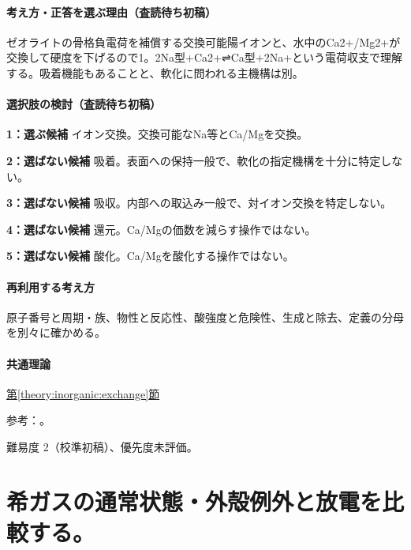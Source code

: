 \paragraph{考え方・正答を選ぶ理由（査読待ち初稿）} ゼオライトの骨格負電荷を補償する交換可能陽イオンと、水中のCa2+/Mg2+が交換して硬度を下げるので1。2Na型+Ca2+⇌Ca型+2Na+という電荷収支で理解する。吸着機能もあることと、軟化に問われる主機構は別。

\paragraph{選択肢の検討（査読待ち初稿）}\mbox{}\par

\noindent\textbf{1：選ぶ候補} イオン交換。交換可能なNa等とCa/Mgを交換。\par

\noindent\textbf{2：選ばない候補} 吸着。表面への保持一般で、軟化の指定機構を十分に特定しない。\par

\noindent\textbf{3：選ばない候補} 吸収。内部への取込み一般で、対イオン交換を特定しない。\par

\noindent\textbf{4：選ばない候補} 還元。Ca/Mgの価数を減らす操作ではない。\par

\noindent\textbf{5：選ばない候補} 酸化。Ca/Mgを酸化する操作ではない。\par

\paragraph{再利用する考え方} 原子番号と周期・族、物性と反応性、酸強度と危険性、生成と除去、定義の分母を別々に確かめる。

\paragraph{共通理論} \hyperref[theory:inorganic:exchange]{第\ref*{theory:inorganic:exchange}節}

\par 参考：\cite{inorganic_zeolite}。

\par 難易度 2（校準初稿）、優先度未評価。

\section{希ガスの通常状態・外殻例外と放電を比較する。}

